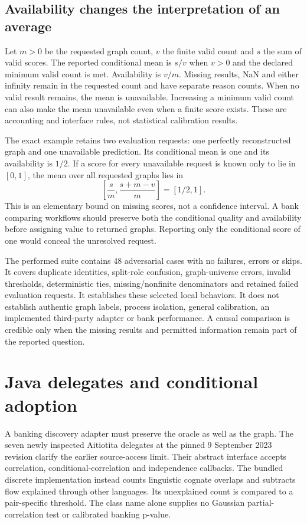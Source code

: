 \subsection{Availability changes the interpretation of an average}
Let $m>0$ be the requested graph count, $v$ the finite valid count and $s$ the sum
of valid scores. The reported conditional mean is $s/v$ when $v>0$ and the declared
minimum valid count is met. Availability is $v/m$. Missing results, NaN and
either infinity remain in the requested count and have separate reason counts.
When no valid result remains, the mean is unavailable. Increasing a minimum
valid count can also make the mean unavailable even when a finite score exists.
These are accounting and interface rules, not statistical calibration results.
\citep{exec28_fj_contract}

The exact example retains two evaluation requests: one perfectly reconstructed
graph and one unavailable prediction. Its conditional mean is one and its
availability is $1/2$. If a score for every unavailable request is known only
to lie in $[0,1]$, the mean over all requested graphs lies in
\[
 \left[\frac{s}{m},\frac{s+m-v}{m}\right]=[1/2,1].
\]
This is an elementary bound on missing scores, not a confidence interval.
A bank comparing workflows should preserve both the conditional quality and
availability before assigning value to returned graphs. Reporting only the
conditional score of one would conceal the unresolved request.
\citep{exec28_fj_reference}

The performed suite contains 48 adversarial cases with no failures, errors or
skips. It covers duplicate identities, split-role confusion, graph-universe
errors, invalid thresholds, deterministic ties, missing/nonfinite denominators
and retained failed evaluation requests. It establishes these selected local
behaviors. It does not establish authentic graph labels, process isolation,
general calibration, an implemented third-party adapter or bank performance.
A causal comparison is credible only when the missing results and permitted
information remain part of the reported question.~\citep{exec28_fj_contract}

\section[Java delegates and conditional adoption]{Java delegates and conditional adoption}
\label{sec:exec28-fj-java}
A banking discovery adapter must preserve the oracle as well as the graph.
The seven newly inspected Aitiotita delegates at the pinned 9 September 2023
revision clarify the earlier source-access limit. Their abstract interface
accepts correlation, conditional-correlation and independence callbacks. The
bundled discrete implementation instead counts linguistic cognate overlaps
and subtracts flow explained through other languages. Its unexplained count
is compared to a pair-specific threshold. The class name alone supplies no
Gaussian partial-correlation test or calibrated banking p-value.
\citep{exec28_fj_java}

